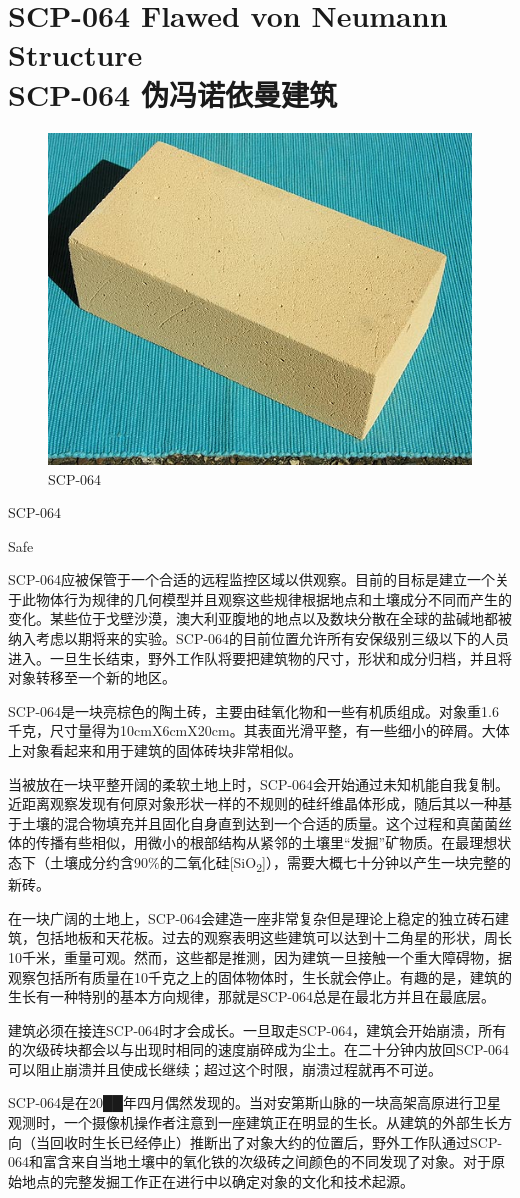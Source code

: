 \chapter[SCP-064 伪冯诺依曼建筑]{
    SCP-064 Flawed von Neumann Structure\\
    SCP-064 伪冯诺依曼建筑
}

\label{chap:SCP-064}

\begin{figure}[H]
    \centering
    \includegraphics[width=0.5\linewidth]{images/SCP.064.jpg}
    \caption*{SCP-064}
\end{figure}

SCP-064

Safe

SCP-064应被保管于一个合适的远程监控区域以供观察。目前的目标是建立一个关于此物体行为规律的几何模型并且观察这些规律根据地点和土壤成分不同而产生的变化。某些位于戈壁沙漠，澳大利亚腹地的地点以及数块分散在全球的盐碱地都被纳入考虑以期将来的实验。SCP-064的目前位置允许所有安保级别三级以下的人员进入。一旦生长结束，野外工作队将要把建筑物的尺寸，形状和成分归档，并且将对象转移至一个新的地区。

SCP-064是一块亮棕色的陶土砖，主要由硅氧化物和一些有机质组成。对象重1.6千克，尺寸量得为10cmX6cmX20cm。其表面光滑平整，有一些细小的碎屑。大体上对象看起来和用于建筑的固体砖块非常相似。

当被放在一块平整开阔的柔软土地上时，SCP-064会开始通过未知机能自我复制。近距离观察发现有何原对象形状一样的不规则的硅纤维晶体形成，随后其以一种基于土壤的混合物填充并且固化自身直到达到一个合适的质量。这个过程和真菌菌丝体的传播有些相似，用微小的根部结构从紧邻的土壤里“发掘”矿物质。在最理想状态下（土壤成分约含90\%的二氧化硅{[}SiO\textsubscript{2}]），需要大概七十分钟以产生一块完整的新砖。

在一块广阔的土地上，SCP-064会建造一座非常复杂但是理论上稳定的独立砖石建筑，包括地板和天花板。过去的观察表明这些建筑可以达到十二角星的形状，周长10千米，重量可观。然而，这些都是推测，因为建筑一旦接触一个重大障碍物，据观察包括所有质量在10千克之上的固体物体时，生长就会停止。有趣的是，建筑的生长有一种特别的基本方向规律，那就是SCP-064总是在最北方并且在最底层。

建筑必须在接连SCP-064时才会成长。一旦取走SCP-064，建筑会开始崩溃，所有的次级砖块都会以与出现时相同的速度崩碎成为尘土。在二十分钟内放回SCP-064可以阻止崩溃并且使成长继续；超过这个时限，崩溃过程就再不可逆。

SCP-064是在20██年四月偶然发现的。当对安第斯山脉的一块高架高原进行卫星观测时，一个摄像机操作者注意到一座建筑正在明显的生长。从建筑的外部生长方向（当回收时生长已经停止）推断出了对象大约的位置后，野外工作队通过SCP-064和富含来自当地土壤中的氧化铁的次级砖之间颜色的不同发现了对象。对于原始地点的完整发掘工作正在进行中以确定对象的文化和技术起源。
